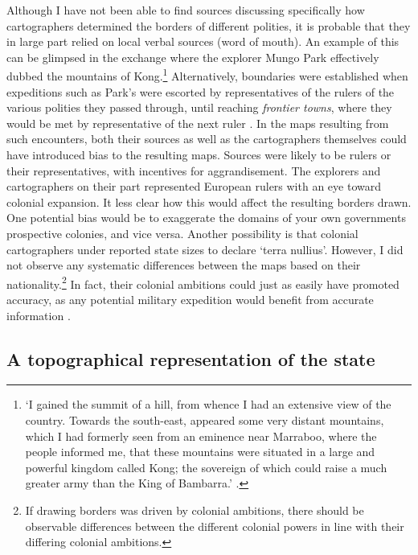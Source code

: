 Although I have not been able to find sources discussing specifically how
cartographers determined the borders of different polities, it is probable that
they in large part relied on local verbal sources (word of mouth). An example of
this can be glimpsed in the exchange where the explorer Mungo Park effectively
dubbed the mountains of Kong.\footnote{`I gained the summit of a hill, from
	whence I had an extensive view of the country. Towards the south-east,
	appeared some very distant mountains, which I had formerly seen from an
	eminence near Marraboo, where the people informed me, that these
	mountains were situated in a large and powerful kingdom called Kong; the
	sovereign of which could raise a much greater army than the King of
Bambarra.' \citep[CHAPTER XVIII]{ParkMungo2015Titi}.} Alternatively, boundaries
were established when expeditions such as Park's were escorted by
representatives of the rulers of the various polities they passed through, until
reaching \textit{frontier towns}, where they would be met by representative of
the next ruler \citep{ParkMungo2015Titi}. In the maps resulting from such
encounters, both their sources as well as the cartographers themselves could
have introduced bias to the resulting maps. Sources were likely to be rulers or
their representatives, with incentives for aggrandisement. The explorers and
cartographers on their part represented European rulers with an eye toward
colonial expansion. It less clear how this would affect the resulting borders
drawn. One potential bias would be to exaggerate the domains of your own
governments prospective colonies, and vice versa. Another possibility is that
colonial cartographers under reported state sizes to declare `terra nullius'.
However, I did not observe any systematic differences between the maps based on
their nationality.\footnote{If drawing borders was driven by colonial ambitions,
there should be observable differences between the different colonial powers in
line with their differing colonial ambitions.} In fact, their colonial ambitions
could just as easily have promoted accuracy, as any potential military
expedition would benefit from accurate information \citep{Bassett_1994}.

\subsection{A topographical representation of the state} 
\label{A topographical representation of the state}

